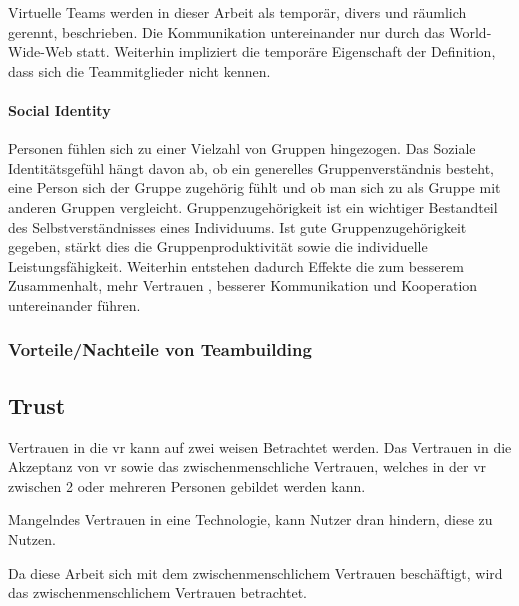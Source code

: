\documentclass[a4paper,11pt]{article}%
\renewcommand{\\}{\vspace*{0.5\baselineskip} \newline}
\begin{document}
Virtuelle Teams werden in dieser Arbeit als temporär, divers und räumlich gerennt, beschrieben. Die Kommunikation untereinander nur durch das World-Wide-Web statt. Weiterhin impliziert die temporäre Eigenschaft der Definition, dass sich die Teammitglieder nicht kennen.
		
		\paragraph{Social Identity}
		Personen fühlen sich zu einer Vielzahl von Gruppen hingezogen. Das Soziale Identitätsgefühl hängt davon ab, ob ein generelles Gruppenverständnis besteht, eine Person sich der Gruppe zugehörig fühlt und ob man sich zu als Gruppe mit anderen Gruppen vergleicht. Gruppenzugehörigkeit ist ein wichtiger Bestandteil des Selbstverständnisses eines Individuums. \citep{sutantovicious}
		Ist gute Gruppenzugehörigkeit gegeben, stärkt dies die Gruppenproduktivität sowie die individuelle Leistungsfähigkeit. Weiterhin entstehen dadurch Effekte die zum besserem Zusammenhalt, mehr Vertrauen \citep{herbsleb2000distance}, besserer Kommunikation und Kooperation untereinander führen. \citep[p. 510]{olson2003psychological}
		
		
		\subsubsection{Vorteile/Nachteile von Teambuilding}
		
		\subsection{Trust}
Vertrauen in die \ac{vr} kann auf zwei weisen Betrachtet werden. Das Vertrauen in die Akzeptanz von \ac{vr} sowie das zwischenmenschliche Vertrauen, welches in der \ac{vr} zwischen 2 oder mehreren Personen gebildet werden kann.

Mangelndes Vertrauen in eine Technologie, kann Nutzer dran hindern, diese zu Nutzen. \citep{trustInVRTechnology}

Da diese Arbeit sich mit dem zwischenmenschlichem Vertrauen beschäftigt, wird das zwischenmenschlichem Vertrauen betrachtet.
\end{document}
